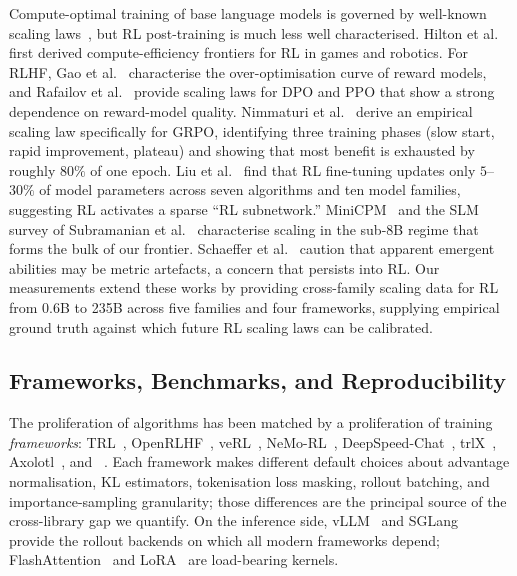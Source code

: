 Compute-optimal training of base language models is governed by
well-known scaling laws~\cite{kaplan2020scalinglaws, hoffmann2022chinchilla, muennighoff2023datascaling}, but RL post-training is much less well
characterised. Hilton et al.~\cite{hilton2023rlscaling} first derived
compute-efficiency frontiers for RL in games and robotics. For RLHF,
Gao et al.~\cite{gao2023reward} characterise the over-optimisation curve of
reward models, and Rafailov et al.~\cite{rafailov2024rlhfscaling} provide
scaling laws for DPO and PPO that show a strong dependence on reward-model
quality. Nimmaturi et al.~\cite{nimmaturi2025predictive} derive an
empirical scaling law specifically for GRPO, identifying three training
phases (slow start, rapid improvement, plateau) and showing that most
benefit is exhausted by roughly $80\%$ of one epoch. Liu et
al.~\cite{liu2025rlsubnetworks} find that RL fine-tuning updates only
$5$--$30\%$ of model parameters across seven algorithms and ten model
families, suggesting RL activates a sparse ``RL subnetwork.''
MiniCPM~\cite{hu2024minicpm} and the SLM survey of
Subramanian et al.~\cite{subramanian2025slm} characterise scaling in the
sub-8B regime that forms the bulk of our frontier. Schaeffer et
al.~\cite{schaeffer2024emergent} caution that apparent emergent abilities may
be metric artefacts, a concern that persists into RL. Our measurements
extend these works by providing cross-family scaling data for RL from
0.6B to 235B across five families and four frameworks, supplying empirical
ground truth against which future RL scaling laws can be calibrated.

\subsection{Frameworks, Benchmarks, and Reproducibility}
\label{sec:related:frameworks}

The proliferation of algorithms has been matched by a proliferation of
training \emph{frameworks}: TRL~\cite{vonwerra2022trl},
OpenRLHF~\cite{hu2024openrlhf}, veRL~\cite{sheng2024verl},
NeMo-RL~\cite{nvidia2024nemorl}, DeepSpeed-Chat~\cite{yao2023deepspeedchat},
trlX~\cite{havrilla2023trlx}, Axolotl~\cite{axolotl2024}, and
\tinker{}~\cite{thinkingmachines2024tinker}. Each framework makes different
default choices about advantage normalisation, KL estimators, tokenisation
loss masking, rollout batching, and importance-sampling granularity; those
differences are the principal source of the cross-library gap we quantify.
On the inference side, vLLM~\cite{kwon2023vllm} and
SGLang~\cite{zheng2024sglang} provide the rollout backends on which all
modern frameworks depend; FlashAttention~\cite{dao2022flashattention} and
LoRA~\cite{hu2022lora} are load-bearing kernels.

